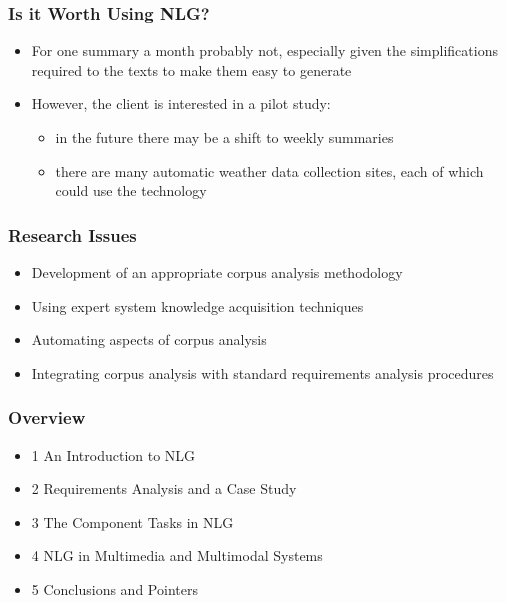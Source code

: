 \documentclass[compress,color=usenames]{beamer}
\begin{document}
\begin{frame}
\frametitle{Is it Worth Using NLG?}

\label{f112}
\begin{itemize}
\item { {For one summary a month probably not, especially given the simplifications required to the texts to make them easy to generate}}
\item { {However, the client is interested in a pilot study: }}
\begin{itemize}
\item in the future there may be a shift to weekly summaries
\item there are many automatic weather data collection sites, each of which could use the technology
\end{itemize}
\end{itemize}

 \end{frame}

\begin{frame}
\frametitle{Research Issues}

\label{f114}
\begin{itemize}
\item { {Development of an appropriate corpus analysis methodology}}
\item { {Using expert system knowledge acquisition techniques}}
\item { {Automating aspects of corpus analysis}}
\item { {Integrating corpus analysis with standard requirements analysis procedures}}
\end{itemize}

 \end{frame}

\begin{frame}
\frametitle{Overview}

\label{f116}
\begin{itemize}
\item { {1 An Introduction to NLG}}
\item { {2 Requirements Analysis and a Case Study}}
\item { {3 The Component Tasks in NLG}}
\item { {4 NLG in Multimedia and Multimodal Systems}}
\item { {5 Conclusions and Pointers}}
\end{itemize}

 
\end{frame}
\end{document}
